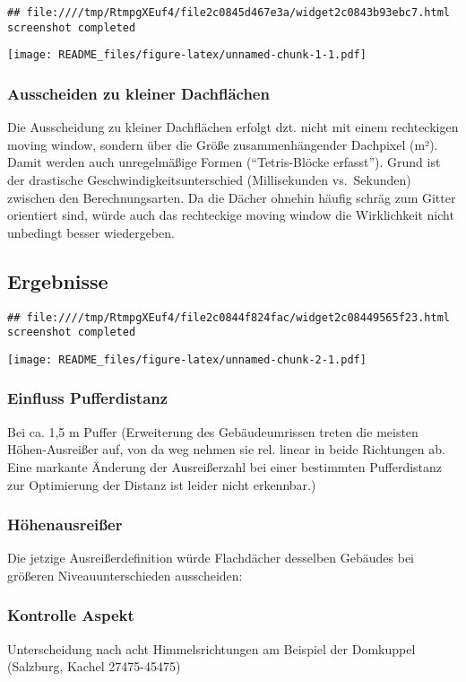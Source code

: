 \documentclass[
]{article}
\begin{document}
\begin{verbatim}
## file:////tmp/RtmpgXEuf4/file2c0845d467e3a/widget2c0843b93ebc7.html screenshot completed
\end{verbatim}

\texttt{[image: README\_files/figure-latex/unnamed-chunk-1-1.pdf]}

\subsubsection{Ausscheiden zu kleiner
Dachflächen}\label{ausscheiden-zu-kleiner-dachfluxe4chen}

Die Ausscheidung zu kleiner Dachflächen erfolgt dzt. nicht mit einem
rechteckigen moving window, sondern über die Größe zusammenhängender
Dachpixel (m²). Damit werden auch unregelmäßige Formen (``Tetris-Blöcke
erfasst''). Grund ist der drastische Geschwindigkeitsunterschied
(Millisekunden vs.~Sekunden) zwischen den Berechnungsarten. Da die
Dächer ohnehin häufig schräg zum Gitter orientiert sind, würde auch das
rechteckige moving window die Wirklichkeit nicht unbedingt besser
wiedergeben.

\subsection{Ergebnisse}\label{ergebnisse}

\begin{verbatim}
## file:////tmp/RtmpgXEuf4/file2c0844f824fac/widget2c08449565f23.html screenshot completed
\end{verbatim}

\texttt{[image: README\_files/figure-latex/unnamed-chunk-2-1.pdf]}

\subsubsection{Einfluss Pufferdistanz}\label{einfluss-pufferdistanz}

Bei ca. 1,5 m Puffer (Erweiterung des Gebäudeumrissen treten die meisten
Höhen-Ausreißer auf, von da weg nehmen sie rel. linear in beide
Richtungen ab. Eine markante Änderung der Ausreißerzahl bei einer
bestimmten Pufferdistanz zur Optimierung der Distanz ist leider nicht
erkennbar.)

\subsubsection{Höhenausreißer}\label{huxf6henausreiuxdfer}

Die jetzige Ausreißerdefinition würde Flachdächer desselben Gebäudes bei
größeren Niveauunterschieden ausscheiden:

\subsubsection{Kontrolle Aspekt}\label{kontrolle-aspekt}

Unterscheidung nach acht Himmelsrichtungen am Beispiel der Domkuppel
(Salzburg, Kachel 27475-45475)
\end{document}

